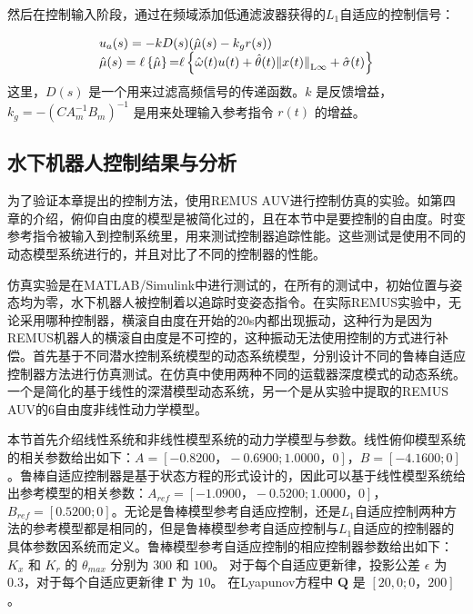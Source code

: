 然后在控制输入阶段，通过在频域添加低通滤波器获得的$L_1$自适应的控制信号：

\begin{equation}
\begin{array}{l}
 {u_a}(s) =  - kD(s)(\hat \mu (s) - {k_g}r(s)) \\
 \hat \mu (s) = \ell \left\{ {\hat \mu } \right\}{\rm{ = }}\ell \left\{ {\hat \omega (t)u(t) + \hat \theta (t){{\left\| {x(t)} \right\|}_{{\rm{L}}\infty }} + \hat \sigma (t)} \right\} \\
 \end{array}
 \label{eq:chap5:59}
\end{equation}
这里，$D(s)$ 是一个用来过滤高频信号的传递函数。$k$ 是反馈增益，$k_g=-(CA_{m}^{-1}B_m)^{-1}$ 是用来处理输入参考指令 $r(t)$ 的增益。


\subsection{水下机器人控制结果与分析 }

为了验证本章提出的控制方法，使用REMUS AUV进行控制仿真的实验。如第四章的介绍，俯仰自由度的模型是被简化过的，且在本节中是要控制的自由度。时变参考指令被输入到控制系统里，用来测试控制器追踪性能。这些测试是使用不同的动态模型系统进行的，并且对比了不同的控制器的性能。

仿真实验是在MATLAB/Simulink中进行测试的，在所有的测试中，初始位置与姿态均为零，水下机器人被控制着以追踪时变姿态指令。在实际REMUS实验中，无论采用哪种控制器，横滚自由度在开始的20s内都出现振动，这种行为是因为REMUS机器人的横滚自由度是不可控的，这种振动无法使用控制的方式进行补偿。首先基于不同潜水控制系统模型的动态系统模型，分别设计不同的鲁棒自适应控制器方法进行仿真测试。在仿真中使用两种不同的运载器深度模式的动态系统。 一个是简化的基于线性的深潜模型动态系统，另一个是从实验中提取的REMUS AUV的6自由度非线性动力学模型\cite{prestero2001development,prestero2001verification}。

本节首先介绍线性系统和非线性模型系统的动力学模型与参数。线性俯仰模型系统的相关参数给出如下：$ A= [-0.8200，-0.6900; 1.0000，0]$，$B = [ - 4.1600; 0]$ 。鲁棒自适应控制器是基于状态方程的形式设计的，因此可以基于线性模型系统给出参考模型的相关参数：$ A_ {ref} = [ - 1.0900，-0.5200; 1.0000，0]$，$ B_ {ref} = [0.5200;0]$。无论是鲁棒模型参考自适应控制，还是$L_1$自适应控制两种方法的参考模型都是相同的，但是鲁棒模型参考自适应控制与$L_1$自适应的控制器的具体参数因系统而定义。鲁棒模型参考自适应控制的相应控制器参数给出如下：$K_x$ 和 $K_r$ 的 $\theta_ {max}$ 分别为 $300$ 和 $100$。 对于每个自适应更新律，投影公差 $\epsilon$ 为 $0.3$，对于每个自适应更新律 $\bm{\Gamma}$ 为 $10$。 在Lyapunov方程中 $\bm {Q} $ 是 $[20,0; 0，200]$。


